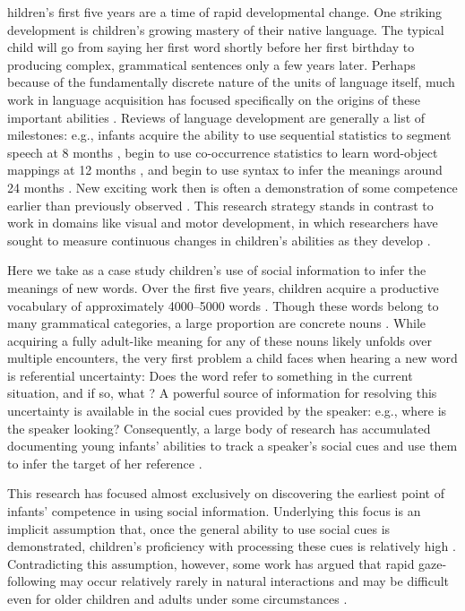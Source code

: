 \documentclass{pnastwo}
\begin{document}
\begin{article}
hildren's first five years are a time of rapid developmental change. One striking development is children's growing mastery of their native language. The typical child will go from saying her first word shortly before her first birthday to producing complex, grammatical sentences only a few years later. Perhaps because of the fundamentally discrete nature of the units of language itself, much work in language acquisition has focused specifically on the origins of these important abilities \cite[but c.f.][]{fernald1998,port2005}. Reviews of language development are generally a list of milestones: e.g., infants acquire the ability to use sequential statistics to segment speech at 8 months \cite{saffran1996}, begin to use co-occurrence statistics to learn word-object mappings at 12 months \cite{smith2008}, and begin to use syntax to infer the meanings around 24 months \cite{gertner2006}. New exciting work then is often a demonstration of some competence earlier than previously observed \cite{bergelson2012}. This research strategy stands in contrast to work in domains like visual and motor development, in which researchers have sought to measure continuous changes in children's abilities as they develop \cite{sokol1978,banks1980,forssberg1991,thelen1995}.

Here we take as a case study children's use of social information to infer the meanings of new words. Over the first five years, children acquire a productive vocabulary of approximately 4000--5000 words \cite{goulden1990}. Though these words belong to many grammatical categories, a large proportion are concrete nouns \cite{bates1994}. While acquiring a fully adult-like meaning for any of these nouns likely unfolds over multiple encounters, the very first problem a child faces when hearing a new word is referential uncertainty: Does the word refer to something in the current situation, and if so, what \cite{carey1978, yu2007, frank2009}? A powerful source of information for resolving this uncertainty is available in the social cues provided by the speaker: e.g., where is the speaker looking? Consequently, a large body of research has accumulated documenting young infants' abilities to track a speaker's social cues and use them to infer the target of her reference \cite[e.g.][]{scaife1975, baldwin1993, hollich2000, senju2008}.

This research has focused almost exclusively on discovering the earliest point of infants' competence in using social information. Underlying this focus is an implicit assumption that, once the general ability to use social cues is demonstrated, children's proficiency with processing these cues is relatively high \cite[e.g.][]{corkum1998, brooks2005, csibra2009}. Contradicting this assumption, however, some work has argued that rapid gaze-following may occur relatively rarely in natural interactions and may be difficult even for older children and adults under some circumstances \cite{loomis2008, vida2012,yu2013}. 


\end{article}
\end{document}
